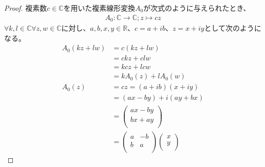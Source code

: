 \documentclass[dvipdfmx]{jsarticle}
\begin{document}
\begin{proof}
複素数$c \in \mathbb{C}$を用いた複素線形変換$A_{0}$が次式のように与えられたとき、
\begin{align*}
A_{0}:\mathbb{C} \rightarrow \mathbb{C};z \mapsto cz
\end{align*}
$\forall k,l \in \mathbb{C}\forall z,w \in \mathbb{C}$に対し、$a,b,x,y \in \mathbb{R}$、$c = a + ib$、$z = x + iy$として次のようになる。
\begin{align*}
A_{0}(kz + lw) &= c(kz + lw)\\
&= ckz + clw\\
&= kcz + lcw\\
&= kA_{0}(z) + lA_{0}(w)\\
A_{0}(z) &= cz = (a + ib)(x + iy)\\
&= (ax - by) + i(ay + bx)\\
&= \begin{pmatrix}
ax - by \\
bx + ay \\
\end{pmatrix}\\
&= \begin{pmatrix}
a & - b \\
b & a \\
\end{pmatrix}\begin{pmatrix}
x \\
y \\
\end{pmatrix}
\end{align*}
\end{proof}
\end{document}
